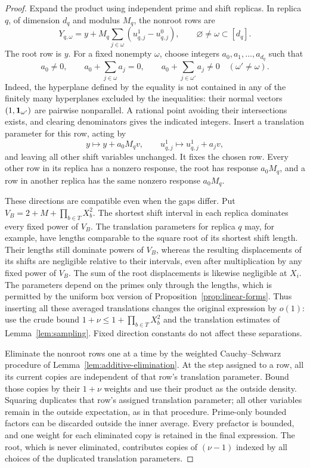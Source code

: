 \begin{proof}
Expand the product using independent prime and shift replicas.  In replica
$q$, of dimension $d_q$ and modulus $M_q$, the nonroot rows are
\[
 Y_{q,\omega}=y+M_q\sum_{j\in\omega}(u_{q,j}^1-u_{q,j}^0),
 \qquad\varnothing\ne\omega\subset[d_q].
\]
The root row is $y$.  For a fixed nonempty $\omega$, choose integers
$a_0,a_1,\ldots,a_{d_q}$ such that
\[
 a_0\ne0,\qquad a_0+\sum_{j\in\omega}a_j=0,\qquad
 a_0+\sum_{j\in\omega'}a_j\ne0\quad(\omega'\ne\omega).
\]
Indeed, the hyperplane defined by the equality is not contained in any
of the finitely many hyperplanes excluded by the inequalities: their
normal vectors $(1,\mathbf 1_{\omega'})$ are pairwise nonparallel.  A rational
point avoiding their intersections exists, and clearing denominators
gives the indicated integers.  Insert a translation parameter for this
row, acting by
\[
 y\longmapsto y+a_0M_qv,\qquad
 u_{q,j}^1\longmapsto u_{q,j}^1+a_jv,
\]
and leaving all other shift variables unchanged.  It fixes the chosen
row.  Every other row in its replica has a nonzero response, the root
has response $a_0M_q$, and a row in another replica has the same nonzero
response $a_0M_q$.

These directions are compatible even when the gaps differ.  Put
$V_B=2+M+\prod_{b\in T}X_b^2$.  The shortest shift interval in each
replica dominates every fixed power of $V_B$.  The translation parameters
for replica $q$ may, for example, have lengths comparable to the square
root of its shortest shift length.  Their lengths still dominate powers
of $V_B$, whereas the resulting displacements of its shifts are
negligible relative to their intervals, even after multiplication by any
fixed power of $V_B$.  The sum of the root displacements is likewise
negligible at $X_i$.  The parameters depend on the primes only through
the lengths, which is permitted by the uniform box version of
Proposition~\ref{prop:linear-forms}.  Thus inserting all these averaged
translations changes the original expression by $o(1)$: use the crude
bound $1+\nu\leq1+\prod_{b\in T}X_b^2$ and the translation estimates of
Lemma~\ref{lem:sampling}.  Fixed direction constants do not affect these
separations.

Eliminate the nonroot rows one at a time by the weighted
Cauchy--Schwarz procedure of Lemma~\ref{lem:additive-elimination}.
At the step assigned to a row, all its current copies are independent
of that row's translation parameter.  Bound those copies by their
$1+\nu$ weights and use their product as the outside density. Squaring
duplicates that row's assigned translation parameter; all other
variables remain in the outside expectation, as in that procedure.
Prime-only bounded factors can be discarded outside the
inner average.  Every prefactor is bounded, and one weight for each
eliminated copy is retained in the final expression.  The root, which
is never eliminated, contributes copies of $(\nu-1)$ indexed by all
choices of the duplicated translation parameters.


\end{proof}
